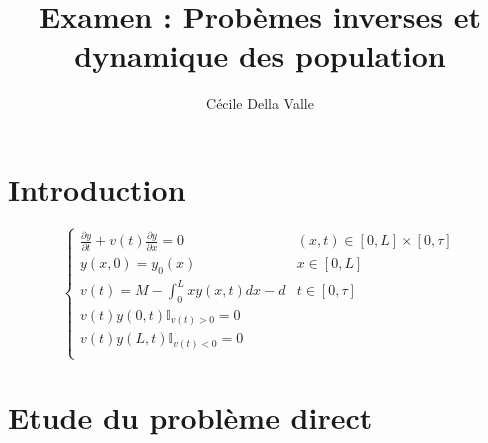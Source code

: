 \documentclass[a4paper]{article}
\title{Examen : Probèmes inverses et dynamique des population}
\author{Cécile Della Valle}
\newcommand{\dep}{d}
\begin{document}
\maketitle

\section{Introduction}


 
\begin{equation}
		\label{eq:poldep}
		\begin{cases}
			\displaystyle \frac{\partial y}{\partial t}+ v(t) \frac{\partial y} {\partial x}  = 0 & (x,t) \in [0,L] \times [0, \tau] \\
             y(x,0) = y_{0} (x) & x\in[0,L]\\
			 v(t) = M - \int_0^L x y(x,t)dx - \dep & t \in [0,\tau]\\
			 v(t)y(0,t)\mathbb{I}_{v(t) > 0} = 0 \\
			 v(t)y(L,t)\mathbb{I}_{v(t) < 0} = 0 \\
		\end{cases}
\end{equation}



\section{Etude du problème direct}
\end{document}
